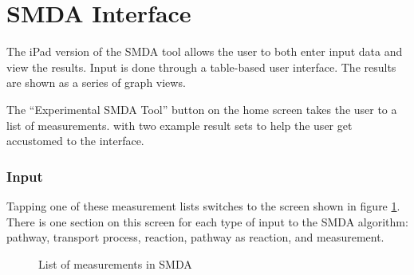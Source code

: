 \section{SMDA Interface}
\label{sect:smda_interface}

The iPad version of the SMDA tool allows the user to both enter input data and
view the results. Input is done through a table-based user interface. The
results are shown as a series of graph views.

The ``Experimental SMDA Tool'' button on the home screen takes the user to a
list of measurements. \mawapp with two example result sets to help the user get
accustomed to the interface.

\subsubsection{Input}
\label{sect:smda_interface_input}

Tapping one of these measurement lists switches to the screen shown in figure
\ref{fig:screenshot_smda_list}. There is one section on this screen for each
type of input to the SMDA algorithm: pathway, transport process, reaction,
pathway as reaction, and measurement.

\begin{figure}[htb]
    \caption{\label{fig:screenshot_smda_list} List of measurements in SMDA}
\end{figure}

